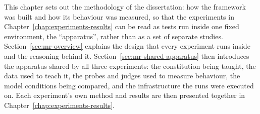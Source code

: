 This chapter sets out the methodology of the dissertation: how the framework was built and how its behaviour was measured, so that the experiments in Chapter~\ref{chap:experiments-results} can be read as tests run inside one fixed environment, the ``apparatus'', rather than as a set of separate studies. Section~\ref{sec:mr-overview} explains the design that every experiment runs inside and the reasoning behind it. Section~\ref{sec:mr-shared-apparatus} then introduces the apparatus shared by all three experiments: the constitution being taught, the data used to teach it, the probes and judges used to measure behaviour, the model conditions being compared, and the infrastructure the runs were executed on. Each experiment's own method and results are then presented together in Chapter~\ref{chap:experiments-results}.

